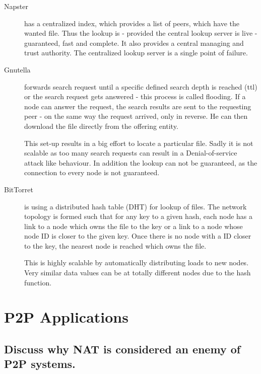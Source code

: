 \documentclass{article}
\begin{document}
\begin{description}

  \item[Napster]

  has a centralized index, which provides a list of peers, which have the wanted
  file. Thus the lookup is - provided the central lookup server is live -
  guaranteed, fast and complete. It also provides a central managing and trust
  authority. The centralized lookup server is a single point of failure.

  \item[Gnutella]

  forwards search request until a specific defined search depth is reached (ttl)
  or the search request gets answered - this process is called flooding. If a
  node can answer the request, the search results are sent to the requesting
  peer - on the same way the request arrived, only in reverse. He can then
  download the file directly from the offering entity.

  This set-up results in a big effort to locate a particular file. Sadly it is
  not scalable as too many search requests can result in a Denial-of-service
  attack like behaviour. In addition the lookup can not be guaranteed, as the
  connection to every node is not guaranteed.

  \item[BitTorret]

  is using a distributed hash table (DHT) for lookup of files. The network
  topology is formed such that for any key to a given hash, each node has a link
  to a node which owns the file to the key or a link to a node whose node ID is
  closer to the given key. Once there is no node with a ID closer to the key,
  the nearest node is reached which owns the file.

  This is highly scalable by automatically distributing loads to new nodes. Very
  similar data values can be at totally different nodes due to the hash
  function.

\end{description}

\section{P2P Applications}

\subsection{Discuss why NAT is considered an enemy of P2P systems.}
\end{document}
